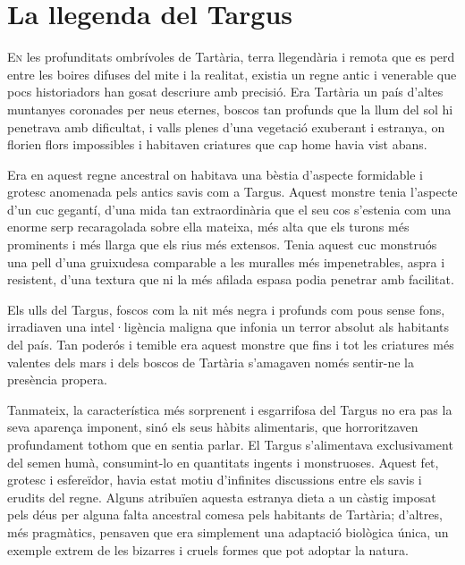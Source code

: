 \chapter{La llegenda del Targus}


\lettrine[loversize=0.2, lines=2]{E}{n} les profunditats ombrívoles de Tartària, terra llegendària i remota que es perd entre les boires difuses del mite i la realitat, existia un regne antic i venerable que pocs historiadors han gosat descriure amb precisió. Era Tartària un país d’altes muntanyes coronades per neus eternes, boscos tan profunds que la llum del sol hi penetrava amb dificultat, i valls plenes d’una vegetació exuberant i estranya, on florien flors impossibles i habitaven criatures que cap home havia vist abans.

Era en aquest regne ancestral on habitava una bèstia d’aspecte formidable i grotesc anomenada pels antics savis com a Targus. Aquest monstre tenia l’aspecte d’un cuc gegantí, d’una mida tan extraordinària que el seu cos s’estenia com una enorme serp recaragolada sobre ella mateixa, més alta que els turons més prominents i més llarga que els rius més extensos. Tenia aquest cuc monstruós una pell d’una gruixudesa comparable a les muralles més impenetrables, aspra i resistent, d’una textura que ni la més afilada espasa podia penetrar amb facilitat.

Els ulls del Targus, foscos com la nit més negra i profunds com pous sense fons, irradiaven una intel·ligència maligna que infonia un terror absolut als habitants del país. Tan poderós i temible era aquest monstre que fins i tot les criatures més valentes dels mars i dels boscos de Tartària s’amagaven només sentir-ne la presència propera.

Tanmateix, la característica més sorprenent i esgarrifosa del Targus no era pas la seva aparença imponent, sinó els seus hàbits alimentaris, que horroritzaven profundament tothom que en sentia parlar. El Targus s’alimentava exclusivament del semen humà, consumint-lo en quantitats ingents i monstruoses. Aquest fet, grotesc i esfereïdor, havia estat motiu d’infinites discussions entre els savis i erudits del regne. Alguns atribuïen aquesta estranya dieta a un càstig imposat pels déus per alguna falta ancestral comesa pels habitants de Tartària; d’altres, més pragmàtics, pensaven que era simplement una adaptació biològica única, un exemple extrem de les bizarres i cruels formes que pot adoptar la natura.

